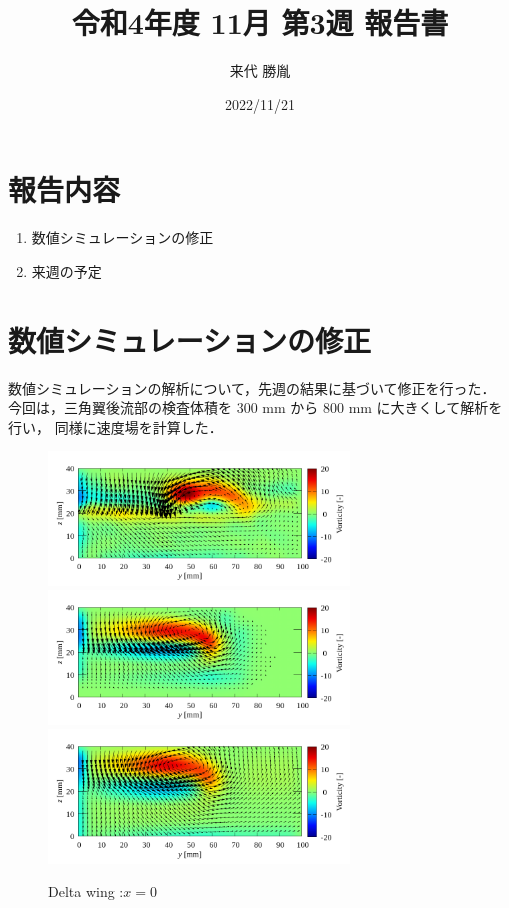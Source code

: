 \documentclass[twocolumn,a4j]{jsarticle}
\author{来代 勝胤}
\title{令和4年度 11月 第3週 報告書}
\date{2022/11/21}
\begin{document}
\columnseprule=0.1mm
\maketitle

\section*{報告内容}
\begin{enumerate}[1.]
  \item 数値シミュレーションの修正
  \item 来週の予定
\end{enumerate}

\section{数値シミュレーションの修正}
数値シミュレーションの解析について，先週の結果に基づいて修正を行った．
今回は，三角翼後流部の検査体積を 300 mm から 800 mm に大きくして解析を行い，
同様に速度場を計算した．

\begin{figure}[htbp]
  \centering
  {
    \includegraphics[keepaspectratio, width=80mm]{../images/Simulation/Compare/experiment_x=0.png}
    \includegraphics[keepaspectratio, width=80mm]{../images/Simulation/Compare/simulation_x=0.png}
    \includegraphics[keepaspectratio, width=80mm]{../images/Simulation/Compare/simulation2_x=0.png}
  }
  \caption{Delta wing :$x=0$}
\end{figure}
\end{document}
